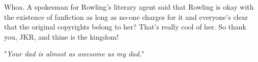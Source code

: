 Whoa. A spokesman for Rowling’s literary agent said that Rowling is okay with the existence of fanfiction as long as no-one charges for it and everyone’s clear that the original copyrights belong to her? That’s really cool of her. So thank you, JKR, and thine is the kingdom!

"\emph{Your dad is almost as awesome as my dad.}"

